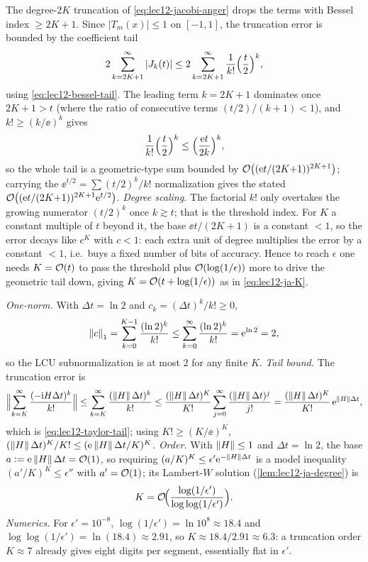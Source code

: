\begin{solution}
The degree-$2K$ truncation of \eqref{eq:lec12-jacobi-anger} drops the terms with Bessel
index $\ge2K+1$. Since $|T_m(x)|\le1$ on $[-1,1]$, the truncation error is bounded by the
coefficient tail
\[
  2\sum_{k=2K+1}^{\infty}|J_k(t)|
  \le2\sum_{k=2K+1}^{\infty}\frac1{k!}\Bigl(\frac t2\Bigr)^k,
\]
using \eqref{eq:lec12-bessel-tail}. The leading term $k=2K+1$ dominates once $2K+1>t$
(where the ratio of consecutive terms $(t/2)/(k+1)<1$), and $k!\ge(k/\ee)^k$ gives
\[
  \frac1{k!}\Bigl(\frac t2\Bigr)^k\le\Bigl(\frac{\mathrm{e} t}{2k}\Bigr)^k,
\]
so the whole tail is a geometric-type sum bounded by
$\mathcal{O}\bigl((\mathrm{e} t/(2K{+}1))^{2K+1}\bigr)$; carrying the $\ee^{t/2}=\sum(t/2)^k/k!$
normalization gives the stated $\mathcal{O}\bigl((\mathrm{e} t/(2K{+}1))^{2K+1}\mathrm{e}^{t/2}\bigr)$.
\emph{Degree scaling.} The factorial $k!$ only overtakes the growing numerator $(t/2)^k$
once $k\gtrsim t$; that is the threshold index. For $K$ a constant multiple of $t$ beyond it,
the base $\ee t/(2K+1)$ is a constant $<1$, so the error decays like $c^{K}$ with $c<1$:
each extra unit of degree multiplies the error by a constant $<1$, i.e.\ buys a fixed number
of bits of accuracy. Hence to reach $\epsilon$ one needs $K=\mathcal{O}(t)$ to pass the threshold
plus $\mathcal{O}(\log(1/\epsilon))$ more to drive the geometric tail down, giving
$K=\mathcal{O}(t+\log(1/\epsilon))$ as in \eqref{eq:lec12-ja-K}.
\end{solution}

\begin{solution}
\emph{One-norm.} With $\Delta t=\ln2$ and $c_k=(\Delta t)^k/k!\ge0$,
\[
  \left\lVert c \right\rVert_1=\sum_{k=0}^{K-1}\frac{(\ln2)^k}{k!}
  \le\sum_{k=0}^{\infty}\frac{(\ln2)^k}{k!}=\mathrm{e}^{\ln2}=2,
\]
so the LCU subnormalization is at most $2$ for any finite $K$. \emph{Tail bound.} The
truncation error is
\[
  \Bigl\|\sum_{k=K}^{\infty}\frac{(-\mathrm{i} H\Delta t)^k}{k!}\Bigr\|
  \le\sum_{k=K}^{\infty}\frac{(\left\lVert H \right\rVert\Delta t)^k}{k!}
  \le\frac{(\left\lVert H \right\rVert\Delta t)^K}{K!}\sum_{j=0}^{\infty}\frac{(\left\lVert H \right\rVert\Delta t)^j}{j!}
  =\frac{(\left\lVert H \right\rVert\Delta t)^K}{K!}\,\mathrm{e}^{\left\lVert H \right\rVert\Delta t},
\]
which is \eqref{eq:lec12-taylor-tail}; using $K!\ge(K/\ee)^K$,
$(\left\lVert H \right\rVert\Delta t)^K/K!\le(\mathrm{e}\left\lVert H \right\rVert\Delta t/K)^K$. \emph{Order.} With $\left\lVert H \right\rVert\le1$ and
$\Delta t=\ln2$, the base $a\vcentcolon=\mathrm{e}\left\lVert H \right\rVert\Delta t=\mathcal{O}(1)$, so requiring
$(a/K)^K\le\epsilon'\mathrm{e}^{-\left\lVert H \right\rVert\Delta t}$ is a model inequality $(a'/K)^K\le\epsilon''$
with $a'=\mathcal{O}(1)$; its Lambert-$W$ solution (\cref{lem:lec12-ja-degree}) is
\[
  K=\mathcal{O}\!\Bigl(\frac{\log(1/\epsilon')}{\log\log(1/\epsilon')}\Bigr).
\]
\emph{Numerics.} For $\epsilon'=10^{-8}$, $\log(1/\epsilon')=\ln10^{8}\approx18.4$ and
$\log\log(1/\epsilon')=\ln(18.4)\approx2.91$, so $K\approx18.4/2.91\approx6.3$: a truncation
order $K\approx7$ already gives eight digits per segment, essentially flat in $\epsilon'$.
\end{solution}

